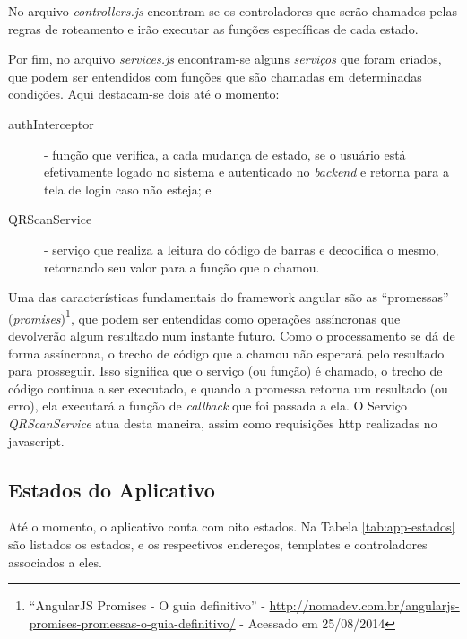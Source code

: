 No arquivo \textit{controllers.js} encontram-se os controladores que serão chamados pelas regras de roteamento e irão executar as funções específicas de cada estado.

Por fim, no arquivo \textit{services.js} encontram-se alguns \textit{serviços} que foram criados, que podem ser entendidos com funções que são chamadas em determinadas condições. Aqui destacam-se dois até o momento:
\begin{description}
    \item[authInterceptor] - função que verifica, a cada mudança de estado, se o usuário está efetivamente logado no sistema e autenticado no \textit{backend} e retorna para a tela de login caso não esteja; e
    \item[QRScanService] - serviço que realiza a leitura do código de barras e decodifica o mesmo, retornando seu valor para a função que o chamou.
\end{description}

Uma das características fundamentais do framework \gls{angular} são as ``promessas'' (\textit{promises})\footnote{``AngularJS Promises - O guia definitivo'' - \url{http://nomadev.com.br/angularjs-promises-promessas-o-guia-definitivo/} - Acessado em 25/08/2014}, que podem ser entendidas como operações assíncronas que devolverão algum resultado num instante futuro. Como o processamento se dá de forma assíncrona, o trecho de código que a chamou não esperará pelo resultado para prosseguir. Isso significa que o serviço (ou função) é chamado, o trecho de código continua a ser executado, e quando a promessa retorna um resultado (ou erro), ela executará a função de \textit{callback} que foi passada a ela. O Serviço \textit{QRScanService} atua desta maneira, assim como requisições \gls{http} realizadas no javascript.

\subsection{Estados do Aplicativo}
Até o momento, o aplicativo conta com oito estados. Na Tabela \ref{tab:app-estados} são listados os estados, e os respectivos endereços, templates e controladores associados a eles.

